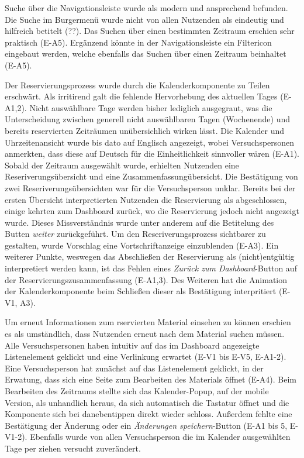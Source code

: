 Suche über die Navigationsleiste wurde als modern und ansprechend befunden. Die Suche im Burgermenü
wurde nicht von allen Nutzenden als eindeutig und hilfreich betitelt (??). Das Suchen über einen
bestimmten Zeitraum erschien sehr praktisch (E-A5). Ergänzend könnte in der Navigationsleiste ein
Filtericon eingebaut werden, welche ebenfalls das Suchen über einen Zeitraum beinhaltet (E-A5).

Der Reservierungsprozess wurde durch die Kalenderkomponente zu Teilen erschwärt. Als irritirend galt
die fehlende Hervorhebung des aktuellen Tages (E-A1,2). Nicht auswählbare Tage werden bisher
lediglich ausgegraut, was die Unterscheidung zwischen generell nicht auswählbaren Tagen (Wochenende)
und bereits reservierten Zeiträumen unübersichlich wirken lässt. Die Kalender und Uhrzeitenansicht
wurde bis dato auf Englisch angezeigt, wobei Versuchspersonen anmerkten, dass diese auf Deutsch für
die Einheitlichkeit sinnvoller wären (E-A1). Sobald der Zeitraum ausgewählt wurde, erhielten
Nutzenden eine Reseriverungsübersicht und eine Zusammenfassungübersicht. Die Bestätigung von zwei
Reseriverungsübersichten war für die Versuchsperson unklar. Bereits bei der ersten Übersicht
interpretierten Nutzenden die Reservierung als abgeschlossen, einige kehrten zum Dashboard zurück,
wo die Reservierung jedoch nicht angezeigt wurde. Dieses Missverständnis wurde unter anderem auf die
Betitelung des Butten \textit{weiter} zurückgeführt. Um den Reseriverungsprozess sichtbarer zu
gestalten, wurde Vorschlag eine Vortschriftanzeige einzublenden (E-A3). Ein weiterer Punkte,
weswegen das Abschließen der Reservierung als (nicht)entgültig interpretiert werden kann, ist das
Fehlen eines \textit{Zurück zum Dashboard}-Button auf der Reservierungszusammenfassung (E-A1,3).
Des Weiteren hat die Animation der Kalenderkomponente beim Schließen dieser als Bestätigung
interpritiert (E-V1, A3).

Um erneut Informationen zum rservierten Material einsehen zu können erschien es als umständlich,
dass Nutzenden erneut nach dem Material suchen müssen. Alle Versuchspersonen haben intuitiv auf das
im Dashboard angezeigte Listenelement geklickt und eine Verlinkung erwartet (E-V1 bis E-V5, E-A1-2).
Eine Versuchsperson hat zunächst auf das Listenelement geklickt, in der Erwatung, dass sich eine
Seite zum Bearbeiten des Materials öffnet (E-A4). Beim Bearbeiten des Zeitraums stellte sich das
Kalender-Popup, auf der mobile Version, als unhandlich heraus, da sich automatisch die Tastatur
öffnet und die Komponente sich bei danebentippen direkt wieder schloss. Außerdem fehlte eine
Bestätigung der Änderung oder ein \textit{Änderungen speichern}-Button (E-A1 bis 5, E-V1-2).
Ebenfalls wurde von allen Versuchsperson die im Kalender ausgewählten Tage per ziehen versucht
zuverändert. 


